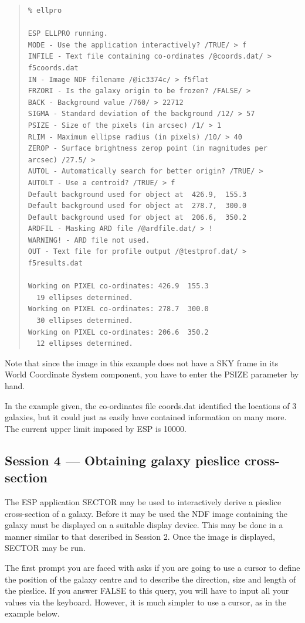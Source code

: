\documentclass[twoside,11pt]{article}
\newcommand{\xlabel}[1]{}
\newenvironment{myquote}{\begin{quote}\begin{small}}{\end{small}\end{quote}}
\begin{document}
\begin{myquote}
\begin{verbatim}
% ellpro
 
ESP ELLPRO running.
MODE - Use the application interactively? /TRUE/ > f
INFILE - Text file containing co-ordinates /@coords.dat/ > f5coords.dat
IN - Image NDF filename /@ic3374c/ > f5flat
FRZORI - Is the galaxy origin to be frozen? /FALSE/ > 
BACK - Background value /760/ > 22712
SIGMA - Standard deviation of the background /12/ > 57
PSIZE - Size of the pixels (in arcsec) /1/ > 1
RLIM - Maximum ellipse radius (in pixels) /10/ > 40
ZEROP - Surface brightness zerop point (in magnitudes per arcsec) /27.5/ > 
AUTOL - Automatically search for better origin? /TRUE/ > 
AUTOLT - Use a centroid? /TRUE/ > f
Default background used for object at  426.9,  155.3 
Default background used for object at  278.7,  300.0 
Default background used for object at  206.6,  350.2 
ARDFIL - Masking ARD file /@ardfile.dat/ > !
WARNING! - ARD file not used.
OUT - Text file for profile output /@testprof.dat/ > f5results.dat
 
Working on PIXEL co-ordinates: 426.9  155.3
  19 ellipses determined.
Working on PIXEL co-ordinates: 278.7  300.0
  30 ellipses determined.
Working on PIXEL co-ordinates: 206.6  350.2
  12 ellipses determined.
\end{verbatim}
\end{myquote}

Note that since the image in this example does not have a SKY 
frame in its World Coordinate System component,
you have to enter the PSIZE parameter by hand.

In the example given, the co-ordinates file coords.dat identified the
locations of 3 galaxies, but it could just as 
easily have contained information on many more. The current 
upper limit imposed by ESP is 10000. 


\subsection{Session 4 --- Obtaining galaxy pieslice cross-section}
\xlabel{SESSION4}

The ESP application SECTOR may be used to interactively derive a
pieslice cross-section of a galaxy. Before it may be used the 
NDF image containing the galaxy must be displayed on a suitable
display device. This may be done in a manner similar to
that described in Session 2. Once the image is displayed, SECTOR 
may be run.

The first prompt you are faced with asks if you are going to use a cursor
to define the position of the galaxy centre and to describe the 
direction, size and length of the pieslice. If you answer FALSE to this query,
you will have to input all your values via the keyboard. However, it is much
simpler to use a cursor, as in the example below.
\end{document}

